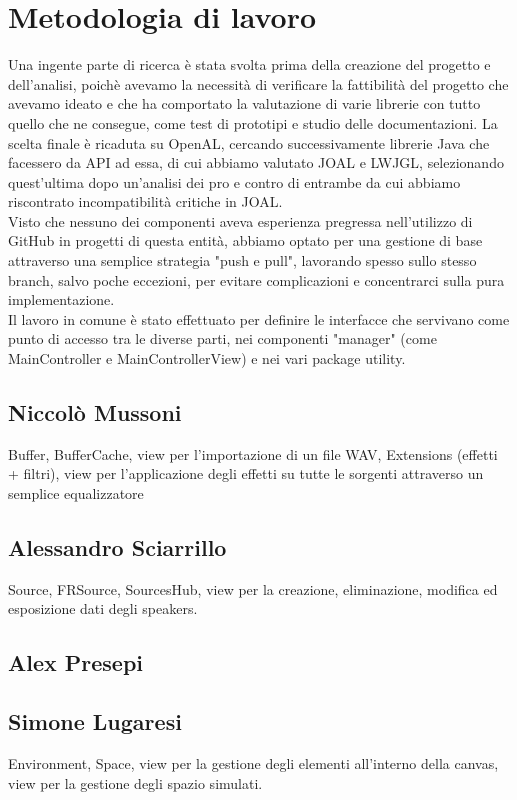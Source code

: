 \documentclass[a4paper,12pt]{report}
\begin{document}
\section{Metodologia di lavoro}
Una ingente parte di ricerca è stata svolta prima della creazione del progetto e dell'analisi, poichè avevamo la necessità di verificare la fattibilità del progetto che avevamo ideato e che ha comportato la valutazione di varie librerie con tutto quello che ne consegue, come test di prototipi e studio delle documentazioni. La scelta finale è ricaduta su OpenAL, cercando successivamente librerie Java che facessero da API ad essa, di cui abbiamo valutato JOAL e LWJGL, selezionando quest'ultima dopo un'analisi dei pro e contro di entrambe da cui abbiamo riscontrato incompatibilità critiche in JOAL.
\\Visto che nessuno dei componenti aveva esperienza pregressa nell'utilizzo di GitHub in progetti di questa entità, abbiamo optato per una gestione di base attraverso una semplice strategia "push e pull", lavorando spesso sullo stesso branch, salvo poche eccezioni, per evitare complicazioni e concentrarci sulla pura implementazione.
\\Il lavoro in comune è stato effettuato per definire le interfacce che servivano come punto di accesso tra le diverse parti, nei componenti "manager" (come MainController e MainControllerView) e nei vari package utility.
\subsection*{Niccolò Mussoni}
Buffer, BufferCache, view per l’importazione di un file WAV, Extensions (effetti + filtri), view per l’applicazione degli effetti su tutte le sorgenti attraverso un semplice equalizzatore
\subsection*{Alessandro Sciarrillo}
 Source, FRSource, SourcesHub, view per la creazione, eliminazione, modifica ed esposizione dati degli speakers.
\subsection*{Alex Presepi}
\subsection*{Simone Lugaresi}
Environment, Space, view per la gestione degli elementi all'interno della canvas, view per la gestione degli spazio simulati.
\end{document}
